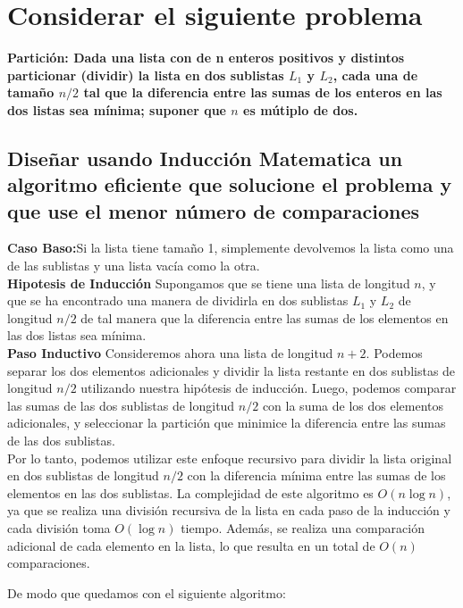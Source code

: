 \section{Considerar el siguiente problema}

\textbf{Partición: Dada una lista con de n enteros positivos y distintos particionar (dividir) la lista en dos
sublistas $L_1$ y $L_2$, cada una de tamaño $n/2$ tal que la diferencia entre las sumas de los
enteros en las dos listas sea mínima; suponer que $n$ es mútiplo de dos.}

\subsection{Diseñar usando Inducción Matematica un algoritmo eficiente que solucione el problema y que use el menor número de comparaciones}

\textbf{Caso Baso:}Si la lista tiene tamaño 1, simplemente devolvemos la lista como una de las sublistas y una lista vacía como la otra.\\
\textbf{Hipotesis de Inducción} Supongamos que se tiene una lista de longitud $n$, y que se ha encontrado una manera de dividirla en dos sublistas $L_1$ y $L_2$ de longitud $n/2$ de tal manera que la diferencia entre las sumas de los elementos en las dos listas sea mínima.\\
\textbf{Paso Inductivo} Consideremos ahora una lista de longitud $n+2$. Podemos separar los dos elementos adicionales y dividir la lista restante en dos sublistas de longitud $n/2$ utilizando nuestra hipótesis de inducción. Luego, podemos comparar las sumas de las dos sublistas de longitud $n/2$ con la suma de los dos elementos adicionales, y seleccionar la partición que minimice la diferencia entre las sumas de las dos sublistas.\\

Por lo tanto, podemos utilizar este enfoque recursivo para dividir la lista original en dos sublistas de longitud $n/2$ con la diferencia mínima entre las sumas de los elementos en las dos sublistas. La complejidad de este algoritmo es $O(n\log n)$, ya que se realiza una división recursiva de la lista en cada paso de la inducción y cada división toma $O(\log n)$ tiempo. Además, se realiza una comparación adicional de cada elemento en la lista, lo que resulta en un total de $O(n)$ comparaciones.

De modo que quedamos con el siguiente algoritmo:

